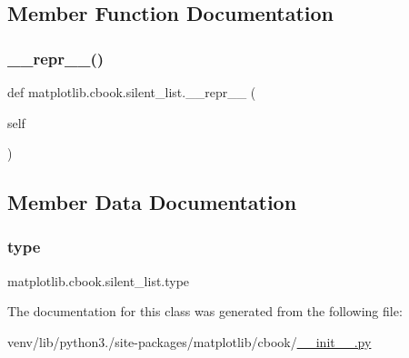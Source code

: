 \subsection{Member Function Documentation}
\mbox{\label{classmatplotlib_1_1cbook_1_1silent__list_a1b851509e318d973b5dbaf4bdd3e12d7}} 
\subsubsection{\texorpdfstring{\+\_\+\+\_\+repr\+\_\+\+\_\+()}{\_\_repr\_\_()}}
{\footnotesize\ttfamily def matplotlib.\+cbook.\+silent\+\_\+list.\+\_\+\+\_\+repr\+\_\+\+\_\+ (\begin{DoxyParamCaption}\item[{}]{self }\end{DoxyParamCaption})}



\subsection{Member Data Documentation}
\mbox{\label{classmatplotlib_1_1cbook_1_1silent__list_afca30ca07f9a02520548a53a8e2cf608}} 
\subsubsection{\texorpdfstring{type}{type}}
{\footnotesize\ttfamily matplotlib.\+cbook.\+silent\+\_\+list.\+type}



The documentation for this class was generated from the following file\+:\begin{DoxyCompactItemize}
\item 
venv/lib/python3./site-\/packages/matplotlib/cbook/\hyperlink{venv_2lib_2python3_89_2site-packages_2matplotlib_2cbook_2____init_____8py}{\+\_\+\+\_\+init\+\_\+\+\_\+.\+py}\end{DoxyCompactItemize}
